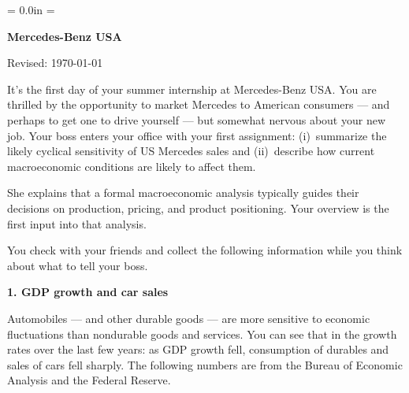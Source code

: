 \documentclass[letterpaper,12pt]{article}
\def\HeadName{Mercedes-Benz USA}
\begin{document}
\parindent = 0.0in
\parskip = \bigskipamount
\thispagestyle{empty}%
\Head

\centerline{\large \bf \HeadName}%
\centerline{Revised:  \today}

\medskip
It's the first day of your summer internship at Mercedes-Benz USA.
You are thrilled by the opportunity to market Mercedes
to American consumers --- and perhaps to get one to drive yourself ---
but somewhat nervous about your new job.
Your boss enters your office with your first assignment:
(i)~summarize the likely cyclical sensitivity of US Mercedes sales
and (ii)~describe how current macroeconomic conditions are likely to affect them.

She explains that a formal macroeconomic analysis
typically guides their decisions on production,
pricing, and product positioning.
Your overview is the first input into that analysis.



You check with your friends and collect the following information
while you think about what to tell your boss.



{\bf 1. GDP growth and car sales\/}


Automobiles --- and other durable goods --- are more sensitive to
economic fluctuations than nondurable goods and services.
You can see that in the growth rates over the last few years:
as GDP growth fell, consumption of durables and sales of cars
fell sharply.
The following numbers are
from the Bureau of Economic Analysis and the Federal Reserve.
\end{document}

